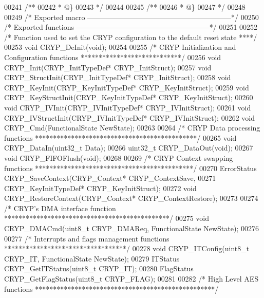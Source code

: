 \begin{DoxyCode}
00241 \textcolor{comment}{/**}
00242 \textcolor{comment}{  * @\}}
00243 \textcolor{comment}{  */}
00244 
00245 \textcolor{comment}{/**}
00246 \textcolor{comment}{  * @\}}
00247 \textcolor{comment}{  */}
00248 
00249 \textcolor{comment}{/* Exported macro ------------------------------------------------------------*/}
00250 \textcolor{comment}{/* Exported functions --------------------------------------------------------*/}
00251 
00252 \textcolor{comment}{/*  Function used to set the CRYP configuration to the default reset state ****/}
00253 \textcolor{keywordtype}{void} CRYP_DeInit(\textcolor{keywordtype}{void});
00254 
00255 \textcolor{comment}{/* CRYP Initialization and Configuration functions ****************************/}
00256 \textcolor{keywordtype}{void} CRYP_Init(CRYP\_InitTypeDef* CRYP\_InitStruct);
00257 \textcolor{keywordtype}{void} CRYP_StructInit(CRYP\_InitTypeDef* CRYP\_InitStruct);
00258 \textcolor{keywordtype}{void} CRYP_KeyInit(CRYP\_KeyInitTypeDef* CRYP\_KeyInitStruct);
00259 \textcolor{keywordtype}{void} CRYP_KeyStructInit(CRYP\_KeyInitTypeDef* CRYP\_KeyInitStruct);
00260 \textcolor{keywordtype}{void} CRYP_IVInit(CRYP\_IVInitTypeDef* CRYP\_IVInitStruct);
00261 \textcolor{keywordtype}{void} CRYP_IVStructInit(CRYP\_IVInitTypeDef* CRYP\_IVInitStruct);
00262 \textcolor{keywordtype}{void} CRYP_Cmd(FunctionalState NewState);
00263 
00264 \textcolor{comment}{/* CRYP Data processing functions *********************************************/}
00265 \textcolor{keywordtype}{void} CRYP_DataIn(uint32\_t Data);
00266 uint32\_t CRYP_DataOut(\textcolor{keywordtype}{void});
00267 \textcolor{keywordtype}{void} CRYP_FIFOFlush(\textcolor{keywordtype}{void});
00268 
00269 \textcolor{comment}{/* CRYP Context swapping functions ********************************************/}
00270 ErrorStatus CRYP_SaveContext(CRYP\_Context* CRYP\_ContextSave,
00271                              CRYP\_KeyInitTypeDef* CRYP\_KeyInitStruct);
00272 \textcolor{keywordtype}{void} CRYP_RestoreContext(CRYP\_Context* CRYP\_ContextRestore);
00273 
00274 \textcolor{comment}{/* CRYP's DMA interface function **********************************************/}
00275 \textcolor{keywordtype}{void} CRYP_DMACmd(uint8\_t CRYP\_DMAReq, FunctionalState NewState);
00276 
00277 \textcolor{comment}{/* Interrupts and flags management functions **********************************/}
00278 \textcolor{keywordtype}{void} CRYP_ITConfig(uint8\_t CRYP\_IT, FunctionalState NewState);
00279 ITStatus CRYP_GetITStatus(uint8\_t CRYP\_IT);
00280 FlagStatus CRYP_GetFlagStatus(uint8\_t CRYP\_FLAG);
00281 
00282 \textcolor{comment}{/* High Level AES functions **************************************************/}

\end{DoxyCode}
